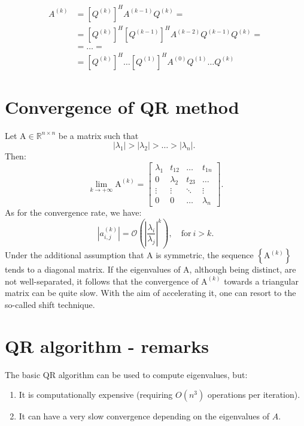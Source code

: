 \documentclass[11pt]{book}
\begin{document}
$$
\begin{aligned}
A^{(k)} & =\left[Q^{(k)}\right]^{H} A^{(k-1)} Q^{(k)}= \\
& =\left[Q^{(k)}\right]^{H}\left[Q^{(k-1)}\right]^{H} A^{(k-2)} Q^{(k-1)} Q^{(k)}= \\
& =\ldots= \\
& =\left[Q^{(k)}\right]^{H} \ldots\left[Q^{(1)}\right]^{H} A^{(0)} Q^{(1)} \ldots Q^{(k)}
\end{aligned}
$$

\section*{Convergence of QR method}
Let $\mathrm{A} \in \mathbb{R}^{n \times n}$ be a matrix such that
$$
\left|\lambda_1\right|>\left|\lambda_2\right|>\ldots>\left|\lambda_n\right| \text {. }
$$
Then:
$$
\lim _{k \rightarrow+\infty} \mathrm{A}^{(k)}=\left[\begin{array}{cccc}
\lambda_1 & t_{12} & \ldots & t_{1 n} \\
0 & \lambda_2 & t_{23} & \ldots \\
\vdots & \vdots & \ddots & \vdots \\
0 & 0 & \ldots & \lambda_n
\end{array}\right] .
$$
As for the convergence rate, we have:
$$
\left|a_{i, j}^{(k)}\right|=\mathcal{O}\left(\left|\frac{\lambda_i}{\lambda_{j}}\right|^k\right), \quad \text{for} \ i>k .
$$
Under the additional assumption that $\mathrm{A}$ is symmetric, the sequence $\left\{\mathrm{A}^{(k)}\right\}$ tends to a diagonal matrix.
If the eigenvalues of A, although being distinct, are not well-separated, it follows that the convergence of $\mathrm{A}^{(k)}$ towards a triangular matrix can be quite slow. With the aim of accelerating it, one can resort to the so-called shift technique.

\section*{QR algorithm - remarks}
The basic QR algorithm can be used to compute eigenvalues, but:
\begin{enumerate}
  \item It is computationally expensive (requiring $O\left(n^{3}\right)$ operations per iteration).

  \item It can have a very slow convergence depending on the eigenvalues of $A$.

\end{enumerate}
\end{document}
